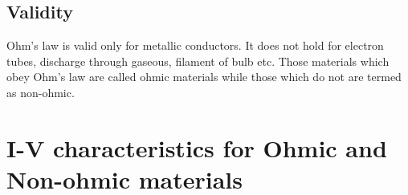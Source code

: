  \subsection*{Validity}
 Ohm’s law is valid only for metallic conductors. It does not hold for electron tubes, discharge through gaseous, filament of bulb etc. Those materials which obey Ohm’s law are called ohmic materials while those which do not are termed as non-ohmic.
 \section{I-V characteristics for Ohmic and Non-ohmic materials}
 